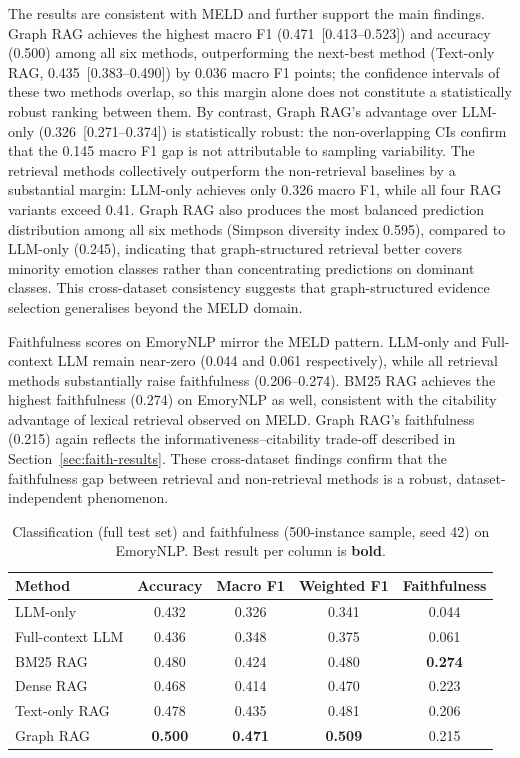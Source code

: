 \documentclass[runningheads]{llncs}
\begin{document}
The results are consistent with MELD and further support the main
findings. Graph RAG achieves the highest macro F1 (0.471~[0.413--0.523]) and accuracy
(0.500) among all six methods, outperforming the next-best method
(Text-only RAG, 0.435~[0.383--0.490]) by 0.036 macro F1 points; the confidence intervals
of these two methods overlap, so this margin alone does not constitute a statistically
robust ranking between them. By contrast, Graph RAG's advantage over
LLM-only (0.326~[0.271--0.374]) is statistically robust: the non-overlapping CIs confirm
that the 0.145 macro F1 gap is not attributable to sampling variability.
The retrieval methods collectively outperform the non-retrieval baselines by a substantial
margin: LLM-only achieves only 0.326 macro F1, while all four RAG
variants exceed 0.41. Graph RAG also produces the most balanced prediction
distribution among all six methods (Simpson diversity index 0.595), compared
to LLM-only (0.245), indicating that graph-structured retrieval better
covers minority emotion classes rather than concentrating predictions on
dominant classes. This cross-dataset consistency suggests that
graph-structured evidence selection generalises beyond the MELD domain.

Faithfulness scores on EmoryNLP mirror the MELD pattern. LLM-only and
Full-context LLM remain near-zero (0.044 and 0.061 respectively),
while all retrieval methods substantially raise faithfulness (0.206--0.274).
BM25 RAG achieves the highest faithfulness (0.274) on EmoryNLP as well,
consistent with the citability advantage of lexical retrieval observed
on MELD. Graph RAG's faithfulness (0.215) again reflects the
informativeness--citability trade-off described in Section~\ref{sec:faith-results}.
These cross-dataset findings confirm that the faithfulness gap between
retrieval and non-retrieval methods is a robust, dataset-independent
phenomenon.

\begin{table}
\centering
\caption{Classification (full test set) and faithfulness (500-instance
sample, seed 42) on EmoryNLP. Best result per column is \textbf{bold}.}
\label{tab:emorynlp-performance}
\begin{tabular}{lcccc}
\toprule
Method & Accuracy & Macro F1 & Weighted F1 & Faithfulness \\
\midrule
LLM-only          & 0.432          & 0.326          & 0.341          & 0.044 \\
Full-context LLM  & 0.436          & 0.348          & 0.375          & 0.061 \\
BM25 RAG          & 0.480          & 0.424          & 0.480          & \textbf{0.274} \\
Dense RAG         & 0.468          & 0.414          & 0.470          & 0.223 \\
Text-only RAG     & 0.478          & 0.435          & 0.481          & 0.206 \\
Graph RAG         & \textbf{0.500} & \textbf{0.471} & \textbf{0.509} & 0.215 \\
\bottomrule
\end{tabular}
\end{table}
\end{document}
